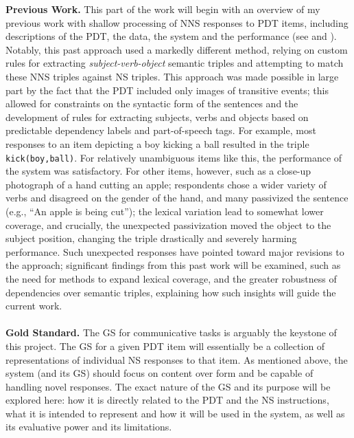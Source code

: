 \documentclass[11pt]{article}
\begin{document}
\textbf{Previous Work.} This part of the work will begin with an overview of my previous work with shallow processing of NNS responses to PDT items, including descriptions of the PDT, the data, the system and the performance (see \citet{king:dickinson:13} and \citet{king:dickinson:14}). Notably, this past approach used a markedly different method, relying on custom rules for extracting \textit{subject-verb-object} semantic triples and attempting to match these NNS triples against NS triples. This approach was made possible in large part by the fact that the PDT included only images of transitive events; this allowed for constraints on the syntactic form of the sentences and the development of rules for extracting subjects, verbs and objects based on predictable dependency labels and part-of-speech tags. For example, most responses to an item depicting a boy kicking a ball resulted in the triple \texttt{kick(boy,ball)}. For relatively unambiguous items like this, the performance of the system was satisfactory. For other items, however, such as a close-up photograph of a hand cutting an apple; respondents chose a wider variety of verbs and disagreed on the gender of the hand, and many passivized the sentence (e.g., ``An apple is being cut''); the lexical variation lead to somewhat lower coverage, and crucially, the unexpected passivization moved the object to the subject position, changing the triple drastically and severely harming performance. Such unexpected responses have pointed toward major revisions to the approach; significant findings from this past work will be examined, such as the need for methods to expand lexical coverage, and the greater robustness of dependencies over semantic triples, explaining how such insights will guide the current work.\\
\\
\textbf{Gold Standard.} The GS for communicative tasks is arguably the keystone of this project. The GS for a given PDT item will essentially be a collection of representations of individual NS responses to that item. As mentioned above, the system (and its GS) should focus on content over form and be capable of handling novel responses. The exact nature of the GS and its purpose will be explored here: how it is directly related to the PDT and the NS instructions, what it is intended to represent and how it will be used in the system, as well as its evaluative power and its limitations. %
\end{document}
